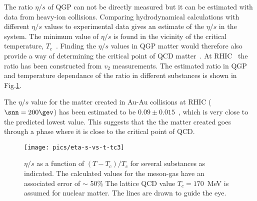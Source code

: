 The ratio $\eta/s$ of QGP can not be directly measured but it can be estimated with data from heavy-ion collisions. Comparing hydrodynamical calculations with different $\eta/s$ values to experimental data gives an estimate of the $\eta/s$ in the system. The minimum value of $\eta/s$ is found in the vicinity of the critical temperature, $T_c$~\cite{PhysRevLett.98.092301}. Finding the $\eta/s$ values in QGP matter would therefore also provide a way of determining the critical point of QCD matter~\cite{PhysRevLett.98.092301}. At RHIC~\cite{PhysRevLett.98.092301} the ratio has been constructed from $v_2$ measurements. The estimated ratio in QGP and temperature dependance of the ratio in different substances is shown in Fig.\ref{fig:etas}. 

The $\eta/s$ value for the matter created in Au-Au collisions at RHIC ($\snn=200\gev$)  has been estimated to be $0.09\pm0.015$~\cite{PhysRevLett.98.092301}, which is very close to the predicted lowest value. %
This suggests that the the matter created goes through a phase where it is close to the critical point of QCD.

\begin{figure}[h!]
\centering
\texttt{[image: pics/eta-s-vs-t-tc3]}
\caption[$\eta/s$ as a function of $(T-T_c)/T_c$]{\label{fig3}$\eta/s$ as a function of $(T-T_c)/T_c$ for several substances as indicated.
	The calculated values for the meson-gas have an associated error 
	of $\sim$ 50\% %
	The lattice QCD value $T_c = 170$~MeV %
	is assumed for nuclear matter. The lines are drawn to guide the eye.~\cite{PhysRevLett.98.092301}
}
\label{fig:etas}

\end{figure}





